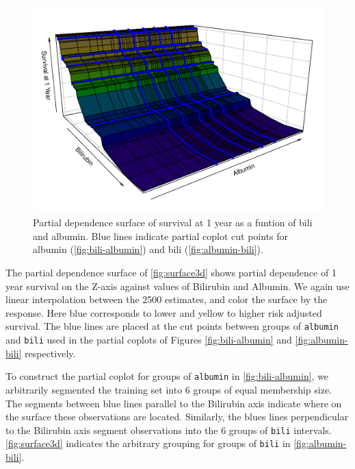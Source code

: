 \documentclass[article]{jss}
\begin{document}
\begin{Schunk}
\begin{figure}[!htb]

{\centering \includegraphics{rfs-surface3d-1} 

}

\caption{Partial dependence surface of survival at 1 year as a funtion of bili and albumin. Blue lines indicate partial coplot cut points for albumin (\autoref{fig:bili-albumin}) and bili (\autoref{fig:albumin-bili}).}\label{fig:surface3d}
\end{figure}
\end{Schunk}

The partial dependence surface of \autoref{fig:surface3d} shows partial
dependence of 1 year survival on the Z-axis against values of Bilirubin
and Albumin. We again use linear interpolation between the 2500
estimates, and color the surface by the response. Here blue corresponds
to lower and yellow to higher risk adjusted survival. The blue lines are
placed at the cut points between groups of \texttt{albumin} and
\texttt{bili} used in the partial coplots of Figures
\ref{fig:bili-albumin} and \ref{fig:albumin-bili} respectively.

To construct the partial coplot for groups of \texttt{albumin} in
\autoref{fig:bili-albumin}, we arbitrarily segmented the training set
into 6 groups of equal membership size. The segments between blue lines
parallel to the Bilirubin axis indicate where on the surface these
observations are located. Similarly, the blues lines perpendicular to
the Bilirubin axis segment observations into the 6 groups of
\texttt{bili} intervals. \autoref{fig:surface3d} indicates the arbitrary
grouping for groups of \texttt{bili} in \autoref{fig:albumin-bili}.
\end{document}
